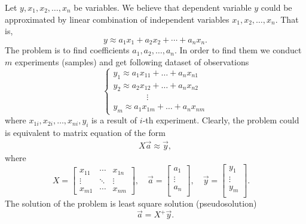         Let $y,x_1,x_2,\ldots,x_n$ be variables. We believe that  dependent variable $y$ could be approximated by linear combination of independent variables $x_1,x_2,\ldots,x_n$. That is,
        $$
           y\approx  a_1x_1+a_2x_2+\cdots +a_nx_n .
        $$
        The problem is to find coefficients $a_1,a_2,\ldots,a_n$. In order to find them we conduct $m$ experiments (samples) and get following dataset of observations
        $$
        \begin{cases}
            y_1\approx a_1x_{11}+\ldots+a_nx_{n1} \nonumber\\    
            y_2\approx a_2x_{12}+\ldots+a_nx_{n2} \nonumber\\    ~~~~~~~~~~~~~~~~~~\vdots~~~~~~~~~~~~~~~~~\nonumber\\
            y_m\approx a_1x_{1m}+\ldots+a_nx_{nm} \nonumber
        \end{cases}
        $$ 
        where $x_{1i},x_{2i},\ldots,x_{ni},y_i$ is a result of $i$-th experiment. Clearly, the problem could is equivalent to matrix equation of the form   
        \begin{eqnarray}
            X\vec{a}\approx\vec{y},\nonumber
        \end{eqnarray}
        where 
        $$
            X=
            \begin{bmatrix}
                x_{11} & \cdots & x_{1n}\\
                \vdots & \ddots & \vdots\\
                x_{m1} & \cdots & x_{nm} 
            \end{bmatrix},
            \quad
            \vec{a}=
            \begin{bmatrix}
                a_{1}\\
                \vdots\\
                a_{n}\\
            \end{bmatrix},\quad
            \vec{y}=
            \begin{bmatrix}
                y_{1}\\
                \vdots\\
                y_{m}\\
            \end{bmatrix}.\quad
        $$
        The solution of the problem is least square solution (pseudosolution)
        $$
        \vec{a}=X^+\vec{y}.
        $$

